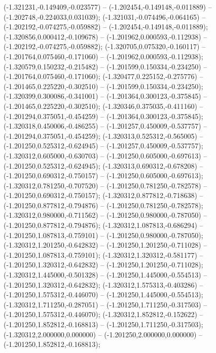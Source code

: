  (-1.321231,-0.149409,-0.023577) -- (-1.202454,-0.149148,-0.011889) -- (-1.202748,-0.224033,0.031039);
 (-1.321031,-0.074496,-0.064165) -- (-1.202192,-0.074275,-0.059882) -- (-1.202454,-0.149148,-0.011889);
 (-1.320856,0.000412,-0.109678) -- (-1.201962,0.000593,-0.112938) -- (-1.202192,-0.074275,-0.059882);
 (-1.320705,0.075320,-0.160117) -- (-1.201764,0.075460,-0.171060) -- (-1.201962,0.000593,-0.112938);
 (-1.320579,0.150232,-0.215482) -- (-1.201599,0.150334,-0.234250) -- (-1.201764,0.075460,-0.171060);
 (-1.320477,0.225152,-0.275776) -- (-1.201465,0.225220,-0.302510) -- (-1.201599,0.150334,-0.234250);
 (-1.320399,0.300086,-0.341001) -- (-1.201364,0.300123,-0.375845) -- (-1.201465,0.225220,-0.302510);
 (-1.320346,0.375035,-0.411160) -- (-1.201294,0.375051,-0.454259) -- (-1.201364,0.300123,-0.375845);
 (-1.320318,0.450006,-0.486255) -- (-1.201257,0.450009,-0.537757) -- (-1.201294,0.375051,-0.454259);
 (-1.320313,0.525312,-0.565005) -- (-1.201250,0.525312,-0.624945) -- (-1.201257,0.450009,-0.537757);
 (-1.320312,0.605000,-0.630703) -- (-1.201250,0.605000,-0.697613) -- (-1.201250,0.525312,-0.624945);
 (-1.320313,0.690312,-0.678208) -- (-1.201250,0.690312,-0.750157) -- (-1.201250,0.605000,-0.697613);
 (-1.320312,0.781250,-0.707520) -- (-1.201250,0.781250,-0.782578) -- (-1.201250,0.690312,-0.750157);
 (-1.320312,0.877812,-0.718638) -- (-1.201250,0.877812,-0.794876) -- (-1.201250,0.781250,-0.782578);
 (-1.320312,0.980000,-0.711562) -- (-1.201250,0.980000,-0.787050) -- (-1.201250,0.877812,-0.794876);
 (-1.320312,1.087813,-0.686294) -- (-1.201250,1.087813,-0.759101) -- (-1.201250,0.980000,-0.787050);
 (-1.320312,1.201250,-0.642832) -- (-1.201250,1.201250,-0.711028) -- (-1.201250,1.087813,-0.759101);
 (-1.320312,1.320312,-0.581177) -- (-1.201250,1.320312,-0.642832) -- (-1.201250,1.201250,-0.711028);
 (-1.320312,1.445000,-0.501328) -- (-1.201250,1.445000,-0.554513) -- (-1.201250,1.320312,-0.642832);
 (-1.320312,1.575313,-0.403286) -- (-1.201250,1.575312,-0.446070) -- (-1.201250,1.445000,-0.554513);
 (-1.320312,1.711250,-0.287051) -- (-1.201250,1.711250,-0.317503) -- (-1.201250,1.575312,-0.446070);
 (-1.320312,1.852812,-0.152622) -- (-1.201250,1.852812,-0.168813) -- (-1.201250,1.711250,-0.317503);
 (-1.320312,2.000000,0.000000) -- (-1.201250,2.000000,0.000000) -- (-1.201250,1.852812,-0.168813);
